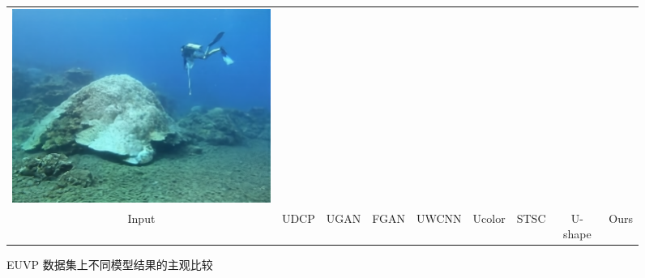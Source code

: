 \begin{figure}[t]
\begin{center}
\begin{tabular}{ccccccccc}
			\includegraphics[width = 0.10\linewidth,height=0.10\linewidth]{figures/ch3/compare/EUVP/Ours/im_f149_.png}   
            \\
			\scriptsize Input
			&\hspace{-0.50cm} \scriptsize UDCP\cite{udcp}
			&\hspace{-0.50cm} \scriptsize UGAN\cite{ugan}
			&\hspace{-0.50cm} \scriptsize FGAN\cite{funie_gan}
			&\hspace{-0.50cm} \scriptsize UWCNN\cite{uwcnn}
			&\hspace{-0.50cm} \scriptsize Ucolor\cite{ucolor}
			&\hspace{-0.50cm} \scriptsize STSC\cite{stsc}
			&\hspace{-0.50cm} \scriptsize U-shape\cite{u-shape}
			&\hspace{-0.50cm} \scriptsize Ours
			\\

		\end{tabular}
	\end{center}
	\vspace{-0.4mm}
	\caption{\label{img:visual-euvp}EUVP 数据集上不同模型结果的主观比较}
	\vspace{-0.3mm}
\end{figure} 


